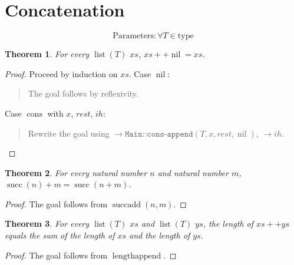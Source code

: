 \documentclass[11pt]{article}
\newtheorem{theorem}{Theorem}[section]
\theoremstyle{definition}
\begin{document}
\section{Concatenation}
\label{ll:main:concatenation}
\[\mathrm{Parameters}: \forall T \in \text{type}\]
\begin{theorem}
\label{ll:main:append-nil}
For every \(\operatorname{list}(T)\) \(xs\), \(xs ++ \operatorname{nil} = xs\).
\end{theorem}
\begin{proof}
Proceed by induction on \(xs\).
Case \(\operatorname{nil}\):
\begin{quote}
The goal follows by reflexivity.
\end{quote}
Case \(\operatorname{cons}\) with \(x\), \(rest\), \(ih\):
\begin{quote}
Rewrite the goal using \(\rightarrow \texttt{Main::cons-append}(T, x, rest, \operatorname{nil})\), \(\rightarrow ih\).
\end{quote}
\end{proof}
\begin{theorem}
\label{ll:main:succ-add-doc}
For every natural number \(n\) and natural number \(m\), \(\operatorname{succ}(n) + m = \operatorname{succ}(n + m)\).
\end{theorem}
\begin{proof}
The goal follows from \(\operatorname{succadd}(n, m)\).
\end{proof}
\begin{theorem}
\label{ll:main:length-append}
For every \(\operatorname{list}(T)\) \(xs\) and \(\operatorname{list}(T)\) \(ys\), the length of \(xs ++ ys\) equals the sum of the length of \(xs\) and the length of \(ys\).
\end{theorem}
\begin{proof}
The goal follows from \(\operatorname{lengthappend}\).
\end{proof}
\end{document}
